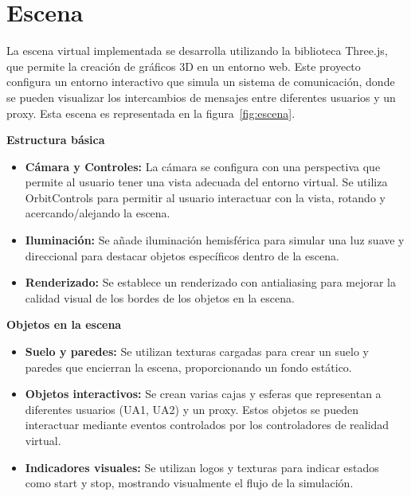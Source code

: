 \documentclass[a4paper, 12pt]{book}
\begin{document}
\section{Escena} 
\label{sec:escena}

La escena virtual implementada se desarrolla utilizando la biblioteca Three.js, 
que permite la creación de gráficos 3D en un entorno web. Este proyecto configura un entorno interactivo 
que simula un sistema de comunicación, donde se pueden visualizar los intercambios de mensajes entre diferentes usuarios y un proxy.
Esta escena es representada en la figura~\ref{fig:escena}.

\bigskip

\textbf{Estructura básica}

\begin{itemize}
  \item \textbf{Cámara y Controles:} La cámara se configura con una perspectiva que permite al usuario tener una vista adecuada del entorno virtual. 
  Se utiliza OrbitControls para permitir al usuario interactuar con la vista, rotando y acercando/alejando la escena.
  
  \item \textbf{Iluminación:} Se añade iluminación hemisférica para simular una luz suave y direccional 
  para destacar objetos específicos dentro de la escena.

  \item \textbf{Renderizado:} Se establece un renderizado con antialiasing para mejorar la calidad visual de los bordes de los objetos en la escena.
  
\end{itemize}

\textbf{Objetos en la escena}

\begin{itemize}
  \item \textbf{Suelo y paredes:} Se utilizan texturas cargadas para crear un suelo y paredes que encierran la escena, proporcionando un fondo estático.
  
  \item \textbf{Objetos interactivos:} Se crean varias cajas y esferas que representan a diferentes usuarios (UA1, UA2) y un proxy. 
  Estos objetos se pueden interactuar mediante eventos controlados por los controladores de realidad virtual.

  \item \textbf{Indicadores visuales:} Se utilizan logos y texturas para indicar estados como start y stop, mostrando visualmente el flujo de la simulación.
  
\end{itemize}
\end{document}
